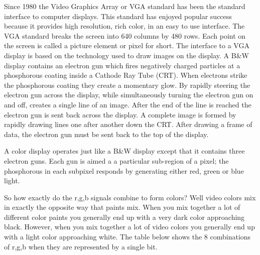                             Since 1980 the Video Graphics Array or VGA standard has been the
                            standard interface to computer displays. This standard has enjoyed
                            popular success because it provides high resolution, rich color,
                            in an easy to use interface. The VGA standard breaks the screen
                            into 640 columns by 480 rows. Each point on the screen is called a
                            picture element or pixel for short. The interface to a VGA display
                            is based on the technology used to draw images on the display. A
                            B\&W display contains an electron gun which fires negatively charged
                            particles at a phosphorous coating inside a Cathode Ray Tube (CRT).
                            When electrons strike the phosphorous coating they create a momentary
                            glow. By rapidly steering the electron gun across the display, while
                            simultaneously turning the electron gun on and off, creates a single
                            line of an image. After the end of the line is reached the electron
                            gun is sent back across the display. A complete image is formed by
                            rapidly drawing lines one after another down the CRT. After drawing
                            a frame of data, the electron gun must be sent back to the top of the
                            display.

                            A color display operates just like a B\&W display except that it contains
                            three electron guns. Each gun is aimed a a particular sub-region of a
                            pixel; the phosphorous in each subpixel responds by generating either
                            red, green or blue light.

                            So how exactly do the r,g,b signals combine to form colors? Well
                            video colors mix in exactly the opposite way that paints mix. When
                            you mix together a lot of different color paints you generally end
                            up with a very dark color approaching black. However, when you mix
                            together a lot of video colors you generally end up with a light
                            color approaching white. The table below shows the 8 combinations
                            of r,g,b when they are represented by a single bit.

